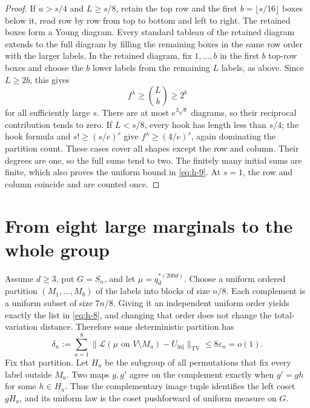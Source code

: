 \documentclass[11pt]{article}
\theoremstyle{remark}
\numberwithin{equation}{section}
\begin{document}
\begin{proof}
If \(u>s/4\) and \(L\ge s/8\), retain the top row and the first \(b=\lfloor s/16\rfloor\) boxes below it, read row by row from top to bottom and left to right. The retained boxes form a Young diagram. Every standard tableau of the retained diagram extends to the full diagram by filling the remaining boxes in the same row order with the larger labels. In the retained diagram, fix \(1,\ldots,b\) in the first \(b\) top-row boxes and choose the \(b\) lower labels from the remaining \(L\) labels, as above. Since \(L\ge2b\), this gives
\[
 f^\lambda\ge\binom Lb\ge2^b
\]
for all sufficiently large \(s\). There are at most \(e^{3\sqrt s}\) diagrams, so their reciprocal contribution tends to zero. If \(L<s/8\), every hook has length less than \(s/4\); the hook formula and \(s!\ge(s/e)^s\) give \(f^\lambda\ge(4/e)^s\), again dominating the partition count. These cases cover all shapes except the row and column. Their degrees are one, so the full sums tend to two. The finitely many initial sums are finite, which also proves the uniform bound in \eqref{eq:h-9}. At \(s=1\), the row and column coincide and are counted once.
\end{proof}

\section{From eight large marginals to the whole group}\label{sec:lift}

Assume \(d\ge3\), put \(G=S_n\), and let \(\mu=q_d^{*(200d)}\). Choose a uniform ordered partition \((M_1,\ldots,M_8)\) of the labels into blocks of size \(n/8\). Each complement is a uniform subset of size \(7n/8\). Giving it an independent uniform order yields exactly the list in \eqref{eq:h-8}, and changing that order does not change the total-variation distance. Therefore some deterministic partition has
\begin{equation}\label{eq:h-10}
 \delta_n:=\sum_{a=1}^8
 \|\mathcal L(\mu\text{ on }V\setminus M_a)-U_{\mathrm{inj}}\|_{\mathrm{TV}}
 \le8\varepsilon_n=o(1).
\end{equation}
Fix that partition. Let \(H_a\) be the subgroup of all permutations that fix every label outside \(M_a\). Two maps \(g,g'\) agree on the complement exactly when \(g'=gh\) for some \(h\in H_a\). Thus the complementary image tuple identifies the left coset \(gH_a\), and its uniform law is the coset pushforward of uniform measure on \(G\).
\end{document}
